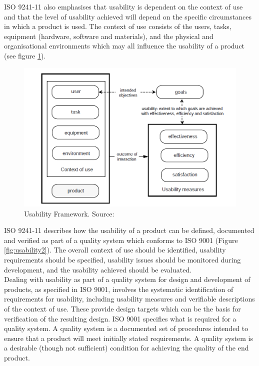 ISO 9241-11 also emphasises that usability is dependent on the context of use and that the
level of usability achieved will depend on the specific circumstances in which a product is
used. The context of use consists of the users, tasks, equipment (hardware, software and
materials), and the physical and organisational environments which may all influence the
usability of a product (see figure \ref{fig:usability1}).

\begin{figure}[H]
\caption{Usability Framework. Source: \cite{bevan1995human}}
\label{fig:usability1}
\includegraphics[scale=0.2]{img/usability1.png}
\end{figure} 

ISO 9241-11 describes how the usability of a product can be defined, documented and
verified as part of a quality system which conforms to ISO 9001 (Figure \ref{fig:usability2}). The overall context of use should be identified, usability requirements should be specified, usability issues should be monitored during development, and the usability achieved should be evaluated. \\
Dealing with usability as part of a quality system for design and development of products, as specified in ISO 9001, involves the systematic identification of requirements for usability, including usability measures and verifiable descriptions of the context of use. These provide design targets which can be the basis for verification of the resulting design. ISO 9001 specifies what is required for a quality system. A quality system is a documented set of procedures intended to ensure that a product will meet initially stated requirements. A quality system is a desirable (though not sufficient) condition for achieving the quality of the end product. 

